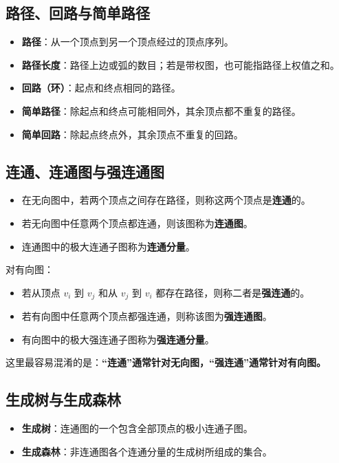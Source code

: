 \documentclass{../../note}
\begin{document}
\subsection{路径、回路与简单路径}

\begin{itemize}
  \item \textbf{路径}：从一个顶点到另一个顶点经过的顶点序列。
  \item \textbf{路径长度}：路径上边或弧的数目；若是带权图，也可能指路径上权值之和。
  \item \textbf{回路（环）}：起点和终点相同的路径。
  \item \textbf{简单路径}：除起点和终点可能相同外，其余顶点都不重复的路径。
  \item \textbf{简单回路}：除起点终点外，其余顶点不重复的回路。
\end{itemize}

\subsection{连通、连通图与强连通图}

\begin{itemize}
  \item 在无向图中，若两个顶点之间存在路径，则称这两个顶点是\textbf{连通}的。
  \item 若无向图中任意两个顶点都连通，则该图称为\textbf{连通图}。
  \item 连通图中的极大连通子图称为\textbf{连通分量}。
\end{itemize}

对有向图：

\begin{itemize}
  \item 若从顶点 $v_i$ 到 $v_j$ 和从 $v_j$ 到 $v_i$ 都存在路径，则称二者是\textbf{强连通}的。
  \item 若有向图中任意两个顶点都强连通，则称该图为\textbf{强连通图}。
  \item 有向图中的极大强连通子图称为\textbf{强连通分量}。
\end{itemize}

这里最容易混淆的是：\textbf{“连通”通常针对无向图，“强连通”通常针对有向图。}

\subsection{生成树与生成森林}

\begin{itemize}
  \item \textbf{生成树}：连通图的一个包含全部顶点的极小连通子图。
  \item \textbf{生成森林}：非连通图各个连通分量的生成树所组成的集合。
\end{itemize}
\end{document}
